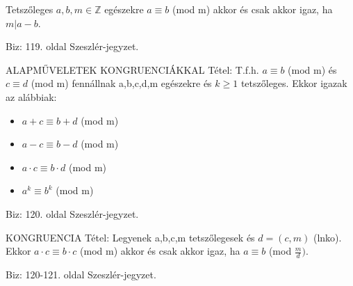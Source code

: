 \begin{framed}
Tetszőleges  $a,b,m\in\mathbb{Z}$ egészekre $a \equiv b$ (mod m) akkor és csak akkor igaz, ha $m|a-b$.
\end{framed}
\begin{leftbar}
Biz: 119. oldal Szeszlér-jegyzet.
\end{leftbar}
\begin{framed}
ALAPMŰVELETEK KONGRUENCIÁKKAL Tétel: T.f.h. $a \equiv b$ (mod m) és $c \equiv d$ (mod m) fennállnak a,b,c,d,m egészekre és $k \geq 1$ tetszőleges. Ekkor igazak az alábbiak:
\begin{itemize}
\item $a + c \equiv b + d$ (mod m)
\item $a - c \equiv b - d$ (mod m)
\item $a \cdot c \equiv b \cdot d$ (mod m)
\item $a^k \equiv b^k$ (mod m)
\end{itemize}
\end{framed}
\begin{leftbar}
Biz: 120. oldal Szeszlér-jegyzet.
\end{leftbar}
\begin{framed}
KONGRUENCIA Tétel: Legyenek a,b,c,m tetszőlegesek és $d = (c,m)$ (lnko). Ekkor $a\cdot c \equiv b\cdot c$ (mod m) akkor és csak akkor igaz, ha $a \equiv b$ (mod $\frac{m}{d})$.
\end{framed}
\begin{leftbar}
Biz: 120-121. oldal Szeszlér-jegyzet.
\end{leftbar}
